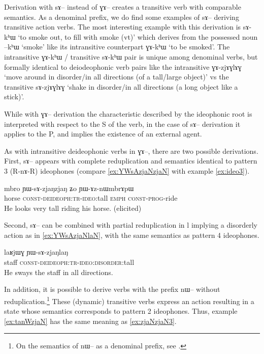 \documentclass[oldfontcommands,oneside,a4paper,11pt]{article}
\newcommand{\ipa}[1]{{\phon \mbox{#1}}} %
\begin{document}
Derivation with \ipa{sɤ--} instead of \ipa{ɣɤ--} creates a transitive verb with comparable semantics. As a denominal prefix, we do find some examples of \ipa{sɤ--} deriving transitive action verbs. The most interesting example with this derivation is \ipa{sɤ-kʰɯ} `to smoke out, to fill with smoke (vt)' which derives from the possessed noun \ipa{--kʰɯ} `smoke' like its intransitive counterpart \ipa{ɣɤ-kʰɯ} `to be smoked'. The intransitive \ipa{ɣɤ-kʰɯ} / transitive  \ipa{sɤ-kʰɯ} pair  is unique among denominal verbs, but formally identical to deiodeophonic verb pairs like the intransitive \ipa{ɣɤ-zjɤɣlɤɣ} `move around in disorder/in all directions (of a tall/large object)' vs the transitive \ipa{sɤ-zjɤɣlɤɣ} `shake in disorder/in all directions (a long object like a stick)'.

While with   \ipa{ɣɤ--} derivation  the characteristic described by the ideophonic root is interpreted with respect to the S of the verb, in the case of   \ipa{sɤ--} derivation it applies to the P, and implies the existence of an external agent.

As with intransitive deideophonic verbs in \ipa{ɣɤ--}, there are two possible derivations. First, \ipa{sɤ--} appears with complete reduplication and semantics identical to pattern 3 (R-\ipa{nɤ}-R) ideophones (compare \ref{ex:YWsAzjaNzjaN} with example \ref{ex:ideo3}).

     \begin{exe}
     \ex \label{ex:YWsAzjaNzjaN}
\gll
\ipa{mbro} 	\ipa{ɲɯ-sɤ-zjaŋzjaŋ} 	\ipa{ʑo} 	\ipa{ɲɯ-ɤz-nɯmbrɤpɯ} \\
horse \textsc{const-deideoph:tr-ideo}:tall \textsc{emph} \textsc{const-prog}-ride \\
\glt He looks very tall riding his horse. (elicited)
\end{exe}

Second,  \ipa{sɤ--}  can be combined with partial reduplication in \ipa{l} implying a disorderly action as in \ref{ex:YWsAzjaNlaN}, with the same semantics as pattern 4 ideophones.

     \begin{exe}
     \ex \label{ex:YWsAzjaNlaN}
\gll
 \ipa{laʁjɯɣ}  	\ipa{ɲɯ-sɤ-zjaŋlaŋ}  \\
  staff \textsc{const-deideoph:tr-ideo:disorder}:tall \\
  \glt He sways the staff in all directions.
\end{exe}

In addition, it is possible to derive   verbs with the prefix \ipa{nɯ--} without reduplication.\footnote{On the semantics of \ipa{nɯ--} as a denominal prefix, see \citealt{jacques14antipassive}.} These (dynamic) transitive verbs express an action resulting in a state whose semantics corresponds to  pattern 2 ideophones. Thus, example \ref{ex:tanWzjaN} has the same meaning as \ref{ex:zjaNzjaN3}. 
\end{document}
